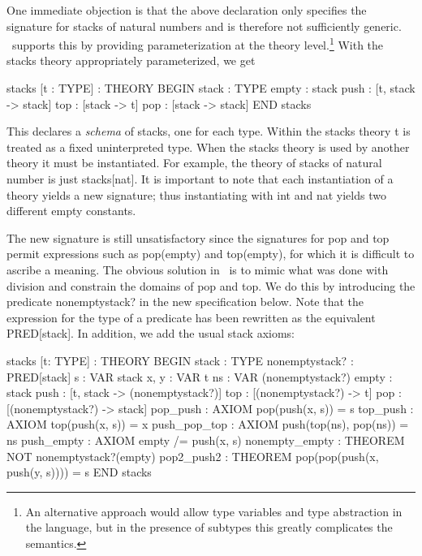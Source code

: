 One immediate objection is that the above declaration only specifies the
signature for stacks of natural numbers and is therefore not
sufficiently generic.  \pvs\ supports this by providing parameterization
at the theory level.\footnote{An alternative approach would allow type
variables and type abstraction in the language, but in the presence of
subtypes this greatly complicates the semantics.} With the {\stt stacks}
theory appropriately parameterized, we get
\begin{pvsex}
  stacks [t : TYPE] : THEORY
   BEGIN
    stack : TYPE
    empty : stack
    push : [t, stack -> stack]
    top : [stack -> t]
    pop : [stack -> stack]
   END stacks
\end{pvsex}
%
This declares a {\em schema\/} of stacks, one for each type.  Within the
{\stt stacks} theory {\stt t} is treated as a fixed uninterpreted type.
When the {\stt stacks} theory is used by another theory it must be
instantiated.  For example, the theory of stacks of natural number is
just {\stt stacks[nat]}.  It is important to note that each instantiation
of a theory yields a new signature; thus instantiating with {\stt int}
and {\stt nat} yields two different {\stt empty} constants.

The new signature is still unsatisfactory since the signatures for {\stt
pop} and {\stt top} permit expressions such as {\stt pop(empty)} and {\stt
top(empty)}, for which it is difficult to ascribe a meaning.  The
obvious solution in \pvs\ is to mimic what was done with division and
constrain the domains of {\stt pop} and {\stt top}.  We do this by
introducing the predicate {\stt nonemptystack?} in the new specification
below.  Note that the expression {} for the type of a
predicate has been rewritten as the equivalent {\stt PRED[stack]}.  In
addition, we add the usual stack axioms: \label{abstractstack}
\begin{pvsex}
  stacks [t: TYPE] : THEORY 
   BEGIN
    stack : TYPE
    nonemptystack? : PRED[stack]
    s : VAR stack
    x, y : VAR t
    ns : VAR (nonemptystack?)
    empty : stack
    push : [t, stack -> (nonemptystack?)]
    top : [(nonemptystack?) -> t]
    pop : [(nonemptystack?) -> stack]
    pop\_push : AXIOM pop(push(x, s)) = s
    top\_push : AXIOM top(push(x, s)) = x
    push\_pop\_top : AXIOM  push(top(ns), pop(ns)) = ns
    push\_empty : AXIOM empty /= push(x, s)
    nonempty\_empty : THEOREM NOT nonemptystack?(empty)
    pop2\_push2 : THEOREM pop(pop(push(x, push(y, s)))) = s   
   END stacks 
\end{pvsex}

